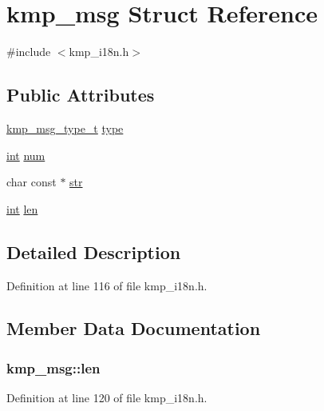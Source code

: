 \hypertarget{structkmp__msg}{\section{kmp\-\_\-msg Struct Reference}
\label{structkmp__msg}
}


{\ttfamily \#include $<$kmp\-\_\-i18n.\-h$>$}

\subsection*{Public Attributes}
\begin{DoxyCompactItemize}
\item 
\hyperlink{kmp__i18n_8h_a3dfb409e54b3be7c93521cd326acee87}{kmp\-\_\-msg\-\_\-type\-\_\-t} \hyperlink{structkmp__msg_a6059b90ca79c673b7b3a33bf4c4d8642}{type}
\item 
\hyperlink{ittnotify__static_8h_a8b8dcd723308a8cb5d84277c7a3fff70}{int} \hyperlink{structkmp__msg_a21b5d71a9147f3809b40c24485a80b3d}{num}
\item 
char const $\ast$ \hyperlink{structkmp__msg_a11afed2746b1029dcb932a89c56feb78}{str}
\item 
\hyperlink{ittnotify__static_8h_a8b8dcd723308a8cb5d84277c7a3fff70}{int} \hyperlink{structkmp__msg_a7f364e8d5196b057c4bbcc300bbe15b9}{len}
\end{DoxyCompactItemize}


\subsection{Detailed Description}


Definition at line 116 of file kmp\-\_\-i18n.\-h.



\subsection{Member Data Documentation}
\hypertarget{structkmp__msg_a7f364e8d5196b057c4bbcc300bbe15b9}{
\subsubsection[{len}]{ kmp\-\_\-msg\-::len}}\label{structkmp__msg_a7f364e8d5196b057c4bbcc300bbe15b9}


Definition at line 120 of file kmp\-\_\-i18n.\-h.



